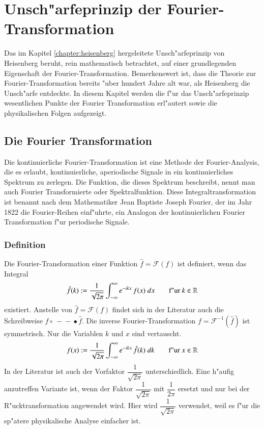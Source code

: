 \chapter{Unsch"arfeprinzip der Fourier-Transformation \label{chapter:heisenbergfourier}}
\begin{refsection}

Das im Kapitel \ref{chapter:heisenberg} hergeleitete Unsch"arfeprinzip von Heisenberg beruht, rein mathematisch betrachtet, auf einer grundlegenden Eigenschaft der Fourier-Transformation.
Bemerkenswert ist, dass die Theorie zur Fourier-Transformation bereits "uber hundert Jahre alt war, als Heisenberg die Unsch"arfe entdeckte.
In diesem Kapitel werden die f"ur das Unsch"arfeprinzip wesentlichen Punkte der Fourier Transformation erl"autert sowie die physikalischen Folgen aufgezeigt.

\section{Die Fourier Transformation}

Die kontinuierliche Fourier-Transformation ist eine Methode der Fourier-Analysis, die es erlaubt, kontinuierliche, aperiodische Signale in ein kontinuierliches Spektrum zu zerlegen.
Die Funktion, die dieses Spektrum beschreibt, nennt man auch Fourier Transformierte oder Spektralfunktion.
Diese Integraltransformation ist benannt nach dem Mathematiker Jean Baptiste Joseph Fourier, der im Jahr 1822 die Fourier-Reihen einf"uhrte, ein Analogon der kontinuierlichen Fourier Transformation f"ur periodische Signale.

\subsection{Definition}

Die Fourier-Transformation einer Funktion $\hat{f}=\mathcal{F}(f)$ ist definiert, wenn das Integral
\begin{equation}
\hat{f}(k) := \dfrac{1}{\sqrt{2\pi}}\int_{-\infty}^{\infty}e^{-i k x} \, f(x) \; dx \qquad \textnormal{f"ur } k \in \mathbb{R}
\end{equation}
existiert.
Anstelle von $\hat{f}=\mathcal{F}(f)$ findet sich in der Literatur auch die Schreibweise $f \circ\,\!\! \!\!-\!\!\!-\!\!\!\bullet \hat{f}$.
Die inverse Fourier-Transformation $f=\mathcal{F}^{-1}(\hat{f})$ ist symmetrisch. Nur die Variablen $k$ und $x$ sind vertauscht.
\begin{equation}
f(x) := \dfrac{1}{\sqrt{2\pi}}\int_{-\infty}^{\infty}e^{-i k x} \, \hat{f}(k) \; dk \qquad \textnormal{f"ur } x \in \mathbb{R}
\end{equation}
In der Literatur ist auch der Vorfaktor $\dfrac{1}{\sqrt{2\pi}}$ unterschiedlich. Eine h"aufig anzutreffen Variante ist, wenn der Faktor $\dfrac{1}{\sqrt{2\pi}}$ mit $\dfrac{1}{2\pi}$ ersetzt und nur bei der R"ucktransformation angewendet wird.
Hier wird $\dfrac{1}{\sqrt{2\pi}}$ verwendet, weil es f"ur die sp"atere physikalische Analyse einfacher ist.


\end{refsection}
